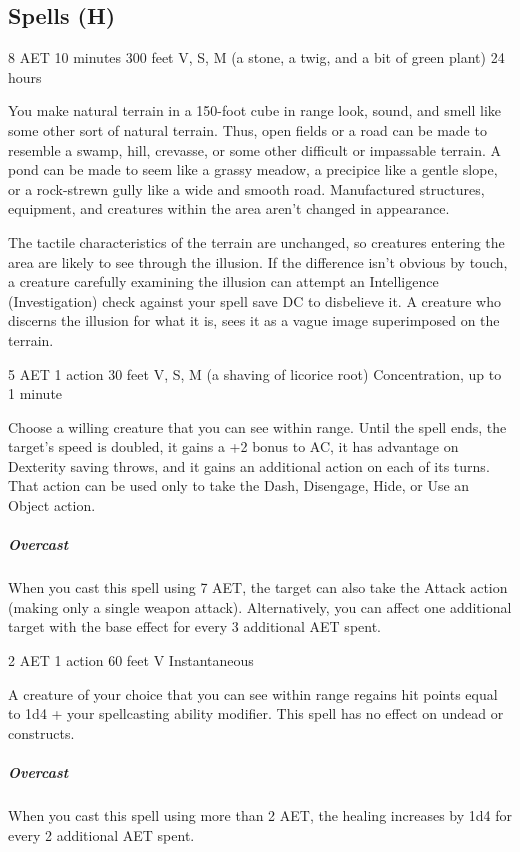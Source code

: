 \subsection{Spells (H)}
\label{spell:hallucinatory-terrain}
{8 AET}
{10 minutes}
{300 feet}
{V, S, M (a stone, a twig, and a bit of green plant)}
{24 hours}

You make natural terrain in a 150-foot cube in range look, sound, and smell like some other sort of natural terrain. Thus, open fields or a road can be made to resemble a swamp, hill, crevasse, or some other difficult or impassable terrain. A pond can be made to seem like a grassy meadow, a precipice like a gentle slope, or a rock-strewn gully like a wide and smooth road. Manufactured structures, equipment, and creatures within the area aren't changed in appearance.

The tactile characteristics of the terrain are unchanged, so creatures entering the area are likely to see through the illusion. If the difference isn't obvious by touch, a creature carefully examining the illusion can attempt an Intelligence (Investigation) check against your spell save DC to disbelieve it. A creature who discerns the illusion for what it is, sees it as a vague image superimposed on the terrain.

\label{spell:haste}
{5 AET}
{1 action}
{30 feet}
{V, S, M (a shaving of licorice root)}
{Concentration, up to 1 minute}

Choose a willing creature that you can see within range. Until the spell ends, the target's speed is doubled, it gains a +2 bonus to AC, it has advantage on Dexterity saving throws, and it gains an additional action on each of its turns. That action can be used only to take the Dash, Disengage, Hide, or Use an Object action.

\subparagraph*{Overcast} When you cast this spell using 7 AET, the target can also take the Attack action (making only a single weapon attack). Alternatively, you can affect one additional target with the base effect for every 3 additional AET spent.

\label{spell:healing-word}
{2 AET}
{1 action}
{60 feet}
{V}
{Instantaneous}

A creature of your choice that you can see within range regains hit points equal to 1d4 + your spellcasting ability modifier. This spell has no effect on undead or constructs.
\subparagraph*{Overcast} When you cast this spell using more than 2 AET, the healing increases by 1d4 for every 2 additional AET spent.

